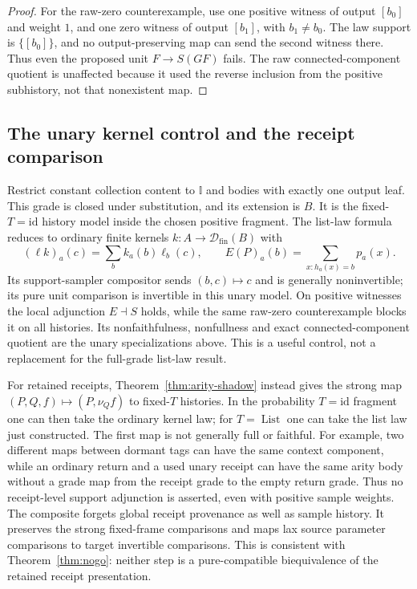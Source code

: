 \documentclass[11pt,a4paper]{article}
\theoremstyle{definition}
\newcommand{\id}{\mathrm{id}}
\newcommand{\List}{\operatorname{List}}
\begin{document}
\begin{proof}
For the raw-zero counterexample, use one positive witness of output $[b_0]$
and weight $1$, and one zero witness of output $[b_1]$, with $b_1\ne b_0$.
The law support is $\{[b_0]\}$, and no output-preserving map can send the
second witness there. Thus even the proposed unit $F\to S(GF)$ fails.
The raw connected-component quotient is unaffected because it used the
reverse inclusion from the positive subhistory, not that nonexistent map.
\end{proof}

\subsection{The unary kernel control and the receipt comparison}
Restrict constant collection content to $\mathbb I$ and bodies with exactly
one output leaf. This grade is closed under substitution, and its extension
is $B$. It is the fixed-$T=\id$ history model inside the chosen positive
fragment. The list-law formula reduces to ordinary finite kernels
$k:A\to\mathcal D_{\mathrm{fin}}(B)$ with
\[
 (\ell k)_a(c)=\sum_b k_a(b)\ell_b(c),\qquad
 E(P)_a(b)=\sum_{x:h_a(x)=b}p_a(x).
\]
Its support-sampler compositor sends $(b,c)\mapsto c$ and is generally
noninvertible; its pure unit comparison is invertible in this unary model.
On positive witnesses the local adjunction $E\dashv S$ holds, while the
same raw-zero counterexample blocks it on all histories. Its nonfaithfulness,
nonfullness and exact connected-component quotient are the unary
specializations above. This is a useful control, not a replacement for the
full-grade list-law result.

For retained receipts, Theorem~\ref{thm:arity-shadow} instead gives the
strong map $(P,Q,f)\mapsto(P,\nu_Qf)$ to fixed-$T$ histories. In the
probability $T=\id$ fragment one can then take the ordinary kernel law;
for $T=\List$ one can take the list law just constructed. The first map is
not generally full or faithful. For example, two different maps between
dormant tags can have the same context component, while an ordinary return
and a used unary receipt can have the same arity body without a grade map
from the receipt grade to the empty return grade. Thus no receipt-level
support adjunction is asserted, even with positive sample weights.
The composite forgets global receipt provenance as well as sample history.
It preserves the strong fixed-frame comparisons and maps lax source
parameter comparisons to target invertible comparisons. This is consistent
with Theorem~\ref{thm:nogo}: neither step is a pure-compatible biequivalence
of the retained receipt presentation.
\end{document}
